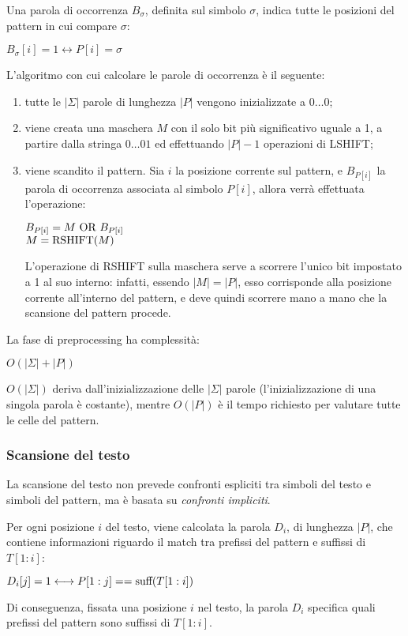 Una parola di occorrenza $B_{\sigma}$, definita sul simbolo $\sigma$, indica tutte le posizioni del pattern in cui compare $\sigma$:
\begin{center}
    $B_{\sigma}[i] = 1 \longleftrightarrow P[i] = \sigma$
\end{center}
L'algoritmo con cui calcolare le parole di occorrenza è il seguente:
\begin{enumerate}
    \item tutte le $|\Sigma|$ parole di lunghezza $|P|$ vengono inizializzate a $0\ldots0$;
    \item viene creata una maschera $M$ con il solo bit più significativo uguale a 1, a partire dalla stringa $0\ldots01$ ed effettuando $|P| - 1$ operazioni di LSHIFT;
    \item viene scandito il pattern.
    Sia $i$ la posizione corrente sul pattern, e $B_{P[i]}$ la parola di occorrenza associata al simbolo $P[i]$, allora verrà effettuata l'operazione:
    \begin{center}
        $B_{P[i]} = M \textnormal{ OR } B_{P[i]}$\\
        $M = \textnormal{RSHIFT}(M)$
    \end{center}
    L'operazione di RSHIFT sulla maschera serve a scorrere l'unico bit impostato a 1 al suo interno: infatti, essendo $|M| = |P|$, esso corrisponde alla posizione corrente all'interno del pattern, e deve quindi scorrere mano a mano che la scansione del pattern procede.
\end{enumerate}
La fase di preprocessing ha complessità:
\begin{center}
    $O(|\Sigma| + |P|)$
\end{center}
$O(|\Sigma|)$ deriva dall'inizializzazione delle $|\Sigma|$ parole (l'inizializzazione di una singola parola è costante), mentre $O(|P|)$ è il tempo richiesto per valutare tutte le celle del pattern.

\subsubsection{Scansione del testo}
La scansione del testo non prevede confronti espliciti tra simboli del testo e simboli del pattern, ma è basata su \textit{confronti impliciti}.

Per ogni posizione $i$ del testo, viene calcolata la parola $D_i$, di lunghezza $|P|$, che contiene informazioni riguardo 
il match tra prefissi del pattern e suffissi di $T[1:i]$:
\begin{center}
    $D_i[j] = 1 \longleftrightarrow P[1:j] == \textnormal{suff}(T[1:i])$
\end{center}
Di conseguenza, fissata una posizione $i$ nel testo, la parola $D_i$ specifica quali prefissi del pattern sono suffissi di $T[1:i]$.

